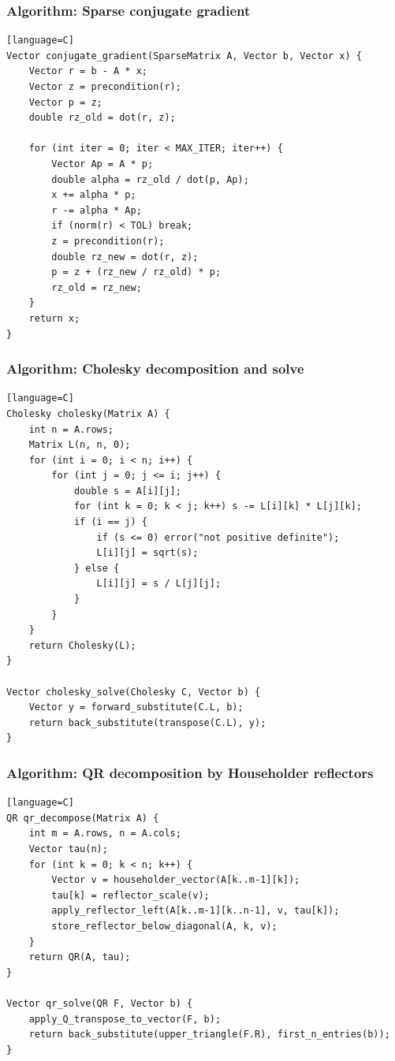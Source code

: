 \documentclass[11pt]{article}
\begin{document}
\subsubsection{Algorithm: Sparse conjugate gradient}\label{algorithm-sparse-conjugate-gradient}

\begin{verbatim}[language=C]
Vector conjugate_gradient(SparseMatrix A, Vector b, Vector x) {
    Vector r = b - A * x;
    Vector z = precondition(r);
    Vector p = z;
    double rz_old = dot(r, z);

    for (int iter = 0; iter < MAX_ITER; iter++) {
        Vector Ap = A * p;
        double alpha = rz_old / dot(p, Ap);
        x += alpha * p;
        r -= alpha * Ap;
        if (norm(r) < TOL) break;
        z = precondition(r);
        double rz_new = dot(r, z);
        p = z + (rz_new / rz_old) * p;
        rz_old = rz_new;
    }
    return x;
}
\end{verbatim}

\subsubsection{Algorithm: Cholesky decomposition and solve}\label{algorithm-cholesky-decomposition-and-solve}

\begin{verbatim}[language=C]
Cholesky cholesky(Matrix A) {
    int n = A.rows;
    Matrix L(n, n, 0);
    for (int i = 0; i < n; i++) {
        for (int j = 0; j <= i; j++) {
            double s = A[i][j];
            for (int k = 0; k < j; k++) s -= L[i][k] * L[j][k];
            if (i == j) {
                if (s <= 0) error("not positive definite");
                L[i][j] = sqrt(s);
            } else {
                L[i][j] = s / L[j][j];
            }
        }
    }
    return Cholesky(L);
}

Vector cholesky_solve(Cholesky C, Vector b) {
    Vector y = forward_substitute(C.L, b);
    return back_substitute(transpose(C.L), y);
}
\end{verbatim}

\subsubsection{Algorithm: QR decomposition by Householder reflectors}\label{algorithm-qr-decomposition-by-householder-reflectors}

\begin{verbatim}[language=C]
QR qr_decompose(Matrix A) {
    int m = A.rows, n = A.cols;
    Vector tau(n);
    for (int k = 0; k < n; k++) {
        Vector v = householder_vector(A[k..m-1][k]);
        tau[k] = reflector_scale(v);
        apply_reflector_left(A[k..m-1][k..n-1], v, tau[k]);
        store_reflector_below_diagonal(A, k, v);
    }
    return QR(A, tau);
}

Vector qr_solve(QR F, Vector b) {
    apply_Q_transpose_to_vector(F, b);
    return back_substitute(upper_triangle(F.R), first_n_entries(b));
}
\end{verbatim}
\end{document}
